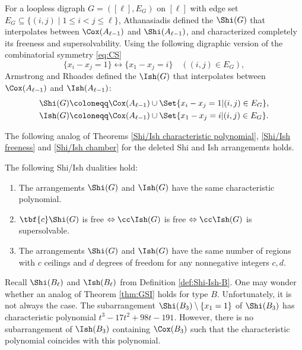 For a loopless digraph $G=([\ell],E_G)$ on $[\ell]$ with edge set $E_G \subseteq \{(i,j) \mid 1 \leq i < j \leq \ell\}$, Athanasiadis \cite{A96, Atha98} defined the  $\Shi(G)$ that interpolates between $\Cox(A_{\ell-1})$ and  $\Shi(A_{\ell-1})$, and characterized completely its freeness and supersolvability. 
Using the following digraphic version of the combinatorial symmetry  \eqref{eq:CS}
\begin{equation*}
\label{eq:digraph-CS}
\{x_{i}-x_{j}= 1\} \longleftrightarrow \{ x_{1}-x_{j} = i\} \quad ((i,j) \in E_G),
\end{equation*}
Armstrong and Rhoades  \cite{AR12} defined the  $\Ish(G)$ that interpolates between  $\Cox(A_{\ell-1})$ and $\Ish(A_{\ell-1})$:
\begin{equation}
\label{eq:GSI}
\begin{aligned}
  \Shi(G) & \coloneqq \Cox(A_{\ell-1})\cup  \Set{ x_{i}-x_{j}= 1 | (i,j) \in E_G }, \\
 \Ish(G) & \coloneqq \Cox(A_{\ell-1})\cup \Set{ x_{1}-x_{j} = i | (i,j) \in E_G }.
\end{aligned}
\end{equation}

The following analog of Theorems \ref{Shi/Ish characteristic polynomial}, \ref{Shi/Ish freeness} and \ref{Shi/Ish chamber} for the deleted Shi and Ish arrangements holds.

\begin{theorem}
\label{thm:GSI}
The following Shi/Ish dualities hold: 
\begin{enumerate}[(1)]
\item The arrangements $\Shi(G)$ and $\Ish(G)$ have the same characteristic polynomial. 
\item $\tbf{c} \Shi(G)$ is free $\Leftrightarrow \cc\Ish(G)$ is free $\Leftrightarrow \cc\Ish(G)$ is supersolvable. 
\item The arrangements $\Shi(G)$ and $\Ish(G)$ have the same number of regions with $c$ ceilings and $d$ degrees of freedom for any nonnegative integers $c,d$.
\end{enumerate}
\end{theorem}

Recall $\Shi(B_{\ell})$ and $\Ish(B_{\ell})$  from Definition \ref{def:Shi-Ish-B}. 
One may wonder whether an analog of Theorem \ref{thm:GSI} holds for type $B$. 
Unfortunately, it is not always the case. 
The subarrangement $\Shi(B_{3})\setminus\{x_{1}=1\}$ of $\Shi(B_{3})$ has characteristic polynomial  $t^{3}-17t^{2}+98t-191$. 
However, there is no subarrangement of $\Ish(B_{3})$ containing $\Cox(B_{3})$ such that the characteristic polynomial coincides with this polynomial. 

